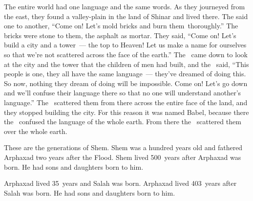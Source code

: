 
\begin{inparaenum}
   The entire world had one language and the same words.%
   As they journeyed from the east, they found a valley-plain in the land of Shinar and lived there.%
   The said one to another, ``Come on! Let's mold bricks and burn them\understood{}\ thoroughly.'' The bricks were stone to them, the asphalt as mortar.%
   They said, ``Come on! Let's build a city and a tower~--- the top to Heaven! Let us make a name for ourselves so that we're not scattered across the face of the earth.''%
   The \lord\ came down to look at the city and the tower that the children of men had built,%
   and the \lord\ said, ``This people is one, they all have the same language~--- they've dreamed of doing this. So now, nothing they dream of doing will be impossible.%
   Come on! Let's go down and we'll confuse their language there so that no one will understand another's language.''%
   The \lord\ scattered them from there across the entire face of the land, and they stopped building the city.%
   For this reason it was named Babel, because there the \lord\ confused the language of the whole earth. From there the \lord\ scattered them over the whole earth.%

   These are the generations of Shem. Shem was a hundred years old and fathered Arphaxad two years after the Flood.%
   Shem lived 500~years after Arphaxad was born. He had sons and daughters born to him.%

   Arphaxad lived 35~years and Salah was born.%
   Arphaxad lived 403~years after Salah was born. He had sons and daughters born to him.%


\end{inparaenum}
